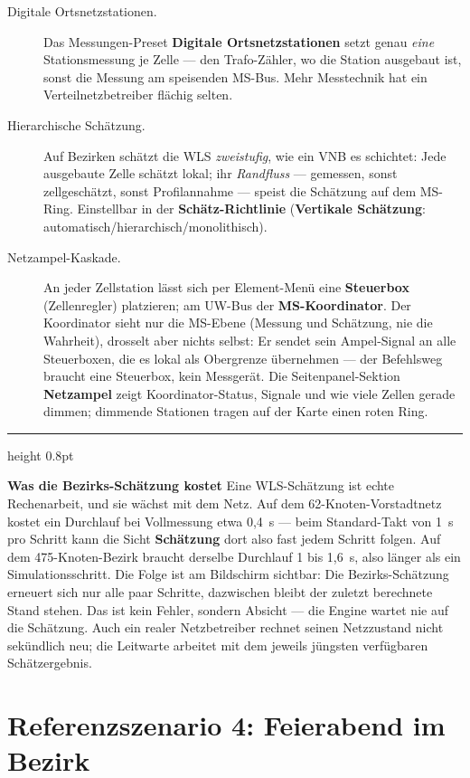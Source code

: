 \documentclass[11pt,a4paper,parskip=half]{scrreprt}
\newcommand{\ui}[1]{\textsf{\bfseries #1}}          %
\newenvironment{beispiel}[1][Beispiel]
  {\par\medskip
   {\color{bsp}\hrule height 0.8pt}\nopagebreak\smallskip
   \noindent\textbf{\textsf{\textcolor{bsp}{#1}}}\quad\ignorespaces}
  {\par\nopagebreak\smallskip{\color{bsp}\hrule height 0.8pt}\par\medskip}
\begin{document}
\begin{description}
  \item[Digitale Ortsnetzstationen.] Das Messungen-Preset
    \ui{Digitale Ortsnetzstationen} setzt genau \emph{eine}
    Stationsmessung je Zelle --- den Trafo-Zähler, wo die Station
    ausgebaut ist, sonst die Messung am speisenden MS-Bus. Mehr
    Messtechnik hat ein Verteilnetzbetreiber flächig selten.
  \item[Hierarchische Schätzung.] Auf Bezirken schätzt die WLS
    \emph{zweistufig}, wie ein VNB es schichtet: Jede ausgebaute
    Zelle schätzt lokal; ihr \emph{Randfluss} --- gemessen, sonst
    zellgeschätzt, sonst Profilannahme --- speist die Schätzung auf
    dem MS-Ring. Einstellbar in der \ui{Schätz-Richtlinie}
    (\ui{Vertikale Schätzung}: automatisch/hierarchisch/monolithisch).
  \item[Netzampel-Kaskade.] An jeder Zellstation lässt sich per
    Element-Menü eine \textbf{Steuerbox} (Zellenregler) platzieren;
    am UW-Bus der \textbf{MS-Koordinator}. Der Koordinator sieht nur
    die MS-Ebene (Messung und Schätzung, nie die Wahrheit), drosselt
    aber nichts selbst: Er sendet sein Ampel-Signal an alle
    Steuerboxen, die es lokal als Obergrenze übernehmen --- der
    Befehlsweg braucht eine Steuerbox, kein Messgerät. Die
    Seitenpanel-Sektion \ui{Netzampel} zeigt Koordinator-Status,
    Signale und wie viele Zellen gerade dimmen; dimmende Stationen
    tragen auf der Karte einen roten Ring.
\end{description}

\begin{beispiel}[Was die Bezirks-Schätzung kostet]
Eine WLS-Schätzung ist echte Rechenarbeit, und sie wächst mit dem
Netz. Auf dem 62-Knoten-Vorstadtnetz kostet ein Durchlauf bei
Vollmessung etwa 0{,}4~s --- beim Standard-Takt von 1~s pro Schritt
kann die Sicht \ui{Schätzung} dort also fast jedem Schritt folgen.
Auf dem 475-Knoten-Bezirk braucht derselbe Durchlauf 1 bis 1{,}6~s,
also länger als ein Simulationsschritt. Die Folge ist am Bildschirm
sichtbar: Die Bezirks-Schätzung erneuert sich nur alle paar
Schritte, dazwischen bleibt der zuletzt berechnete Stand stehen.
Das ist kein Fehler, sondern Absicht --- die Engine wartet nie auf
die Schätzung. Auch ein realer Netzbetreiber rechnet seinen
Netzzustand nicht sekündlich neu; die Leitwarte arbeitet mit dem
jeweils jüngsten verfügbaren Schätzergebnis.
\end{beispiel}

\section{Referenzszenario 4: Feierabend im Bezirk}
\end{document}
